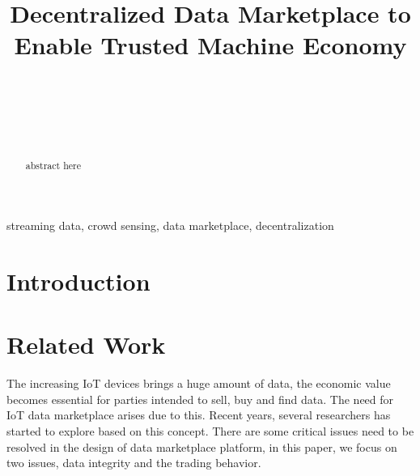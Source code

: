 \documentclass[journal,a4paper]{IEEEtran}
\begin{document}
%
\title{Decentralized Data Marketplace to Enable Trusted Machine Economy}
%
\author{
 \\

 \\

 \\

 \\

}


%


\maketitle              
\begin{abstract}
abstract here
\end{abstract}

\begin{IEEEkeywords}
streaming data, crowd sensing, data marketplace, decentralization
\end{IEEEkeywords}

\section{Introduction}

\section{Related Work}
The increasing IoT devices brings a huge amount of data, the economic value becomes essential for parties intended to sell, buy and find data. The need for IoT data marketplace arises due to this. Recent years, several researchers has started to explore based on this concept. There are some critical issues need to be resolved in the design of data marketplace platform, in this paper, we focus on two issues, data integrity and the trading behavior.
\end{document}

